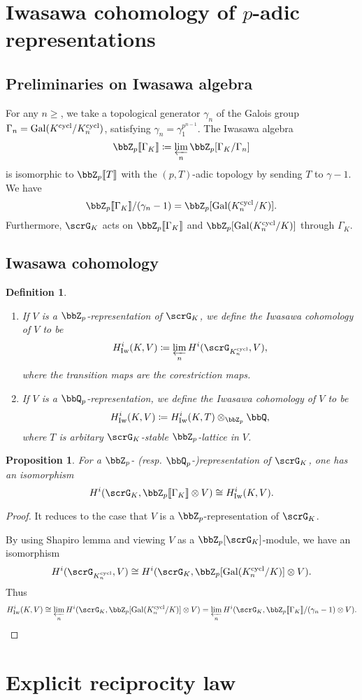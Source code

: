 \documentclass[a4paper,oneside]{amsart}
\newtheorem{proposition}[theorem]{Proposition}
\newtheorem{definition}[theorem]{Definition}
\numberwithin{equation}{section}
\numberwithin{figure}{section}
\begin{document}
\section{Iwasawa cohomology of $p$-adic representations}
\subsection{Preliminaries on Iwasawa algebra}
For any $n\geq $, we take a topological generator $\gamma_n$ of the Galois group $\Gamma_n=\operatorname{Gal}(K^{\operatorname{cycl}}/K_n^{\operatorname{cycl}})$, satisfying $\gamma_n=\gamma_1^{p^{n-1}}$. The Iwasawa algebra
$$\bbZ_p\llbracket\Gamma_K\rrbracket\coloneqq \varprojlim_n \bbZ_p[\Gamma_K/\Gamma_n]$$
is isomorphic to $\bbZ_p\llbracket T\rrbracket$ with the $(p,T)$-adic topology by sending $T$ to $\gamma-1$. We have
$$\bbZ_p\llbracket \Gamma_K\rrbracket/(\gamma_n-1)=\bbZ_p[\opn{Gal}(K_n^{\opn{cycl}}/K)].$$
Furthermore, $\scrG_K$ acts on $\bbZ_p\llbracket\Gamma_K\rrbracket$ and $\bbZ_p[\opn{Gal}(K_n^{\opn{cycl}}/K)]$ through $\Gamma_K$.


\subsection{Iwasawa cohomology}
\begin{definition}\leavevmode
    \begin{enumerate}
        \item If $V$ is a $\bbZ_p$-representation of $\scrG_K$, we define the Iwasawa cohomology of $V$ to be
              $$H^i_{\opn{Iw}}(K,V)\coloneqq \varprojlim_n H^i(\scrG_{K_n^{\opn{cycl}}},V),$$
              where the transition maps are the corestriction maps.
        \item If $V$ is a $\bbQ_p$-representation, we define the Iwasawa cohomology of $V$ to be
              $$H^i_{\opn{Iw}}(K,V)\coloneqq H^i_{\opn{Iw}}(K,T)\otimes_{\bbZ_p} \bbQ,$$
              where $T$ is arbitary $\scrG_K$-stable $\bbZ_p$-lattice in $V$.
    \end{enumerate}
\end{definition}

\begin{proposition}
    For a $\bbZ_p$- (resp. $\bbQ_p$-)representation of $\scrG_K$, one has an isomorphism
    $$H^i(\scrG_K,\bbZ_p\llbracket \Gamma_K\rrbracket\otimes V)\cong H^i_{\opn{Iw}}(K,V).$$
\end{proposition}
\begin{proof}
    It reduces to the case that $V$ is a $\bbZ_p$-representation of $\scrG_K$.

    By using Shapiro lemma and viewing $V$ as a $\bbZ_p[\scrG_K]$-module, we have an isomorphism
    $$H^i(\scrG_{K_n^{\opn{cycl}}},V)\cong H^i(\scrG_K,\bbZ_p[\opn{Gal}(K_n^{\opn{cycl}}/K)]\otimes V).$$
    Thus
    $$H^i_{\opn{Iw}}(K,V)\cong\varprojlim_n H^i(\scrG_K,\bbZ_p[\opn{Gal}(K_n^{\opn{cycl}}/K)]\otimes V)=\varprojlim_n H^i(\scrG_K,\bbZ_p\llbracket\Gamma_K\rrbracket/(\gamma_n-1)\otimes V).$$
\end{proof}


\section{Explicit reciprocity law}

\printbibliography
\end{document}
